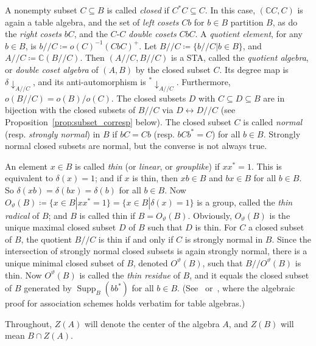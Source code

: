 \documentclass[ALCO,ThmDefs,Unicode,epreuves]{cedram}
\DeclareMathOperator{\Supp}{Supp}
\newcommand{\C}{{\mathbb C}}
\begin{document}
A nonempty subset $C \subseteq B$ is called \emph{closed} if $C^*C
\subseteq C$. In this case, $({\C}C, C)$ is again a table algebra, and
the set of \emph{left cosets} $Cb$ for $b \in B$ partition $B$, as do
the \emph{right cosets} $bC$, and the $C$-$C$ \emph{double cosets}
$CbC$. A \emph{quotient element}, for any $b \in B$, is $b//C \coloneqq 
o(C)^{-1}(CbC)^+$. Let $B//C \coloneqq \{b//C | b \in B\}$, and
$A//C \coloneqq {\C}(B//C)$. Then $(A//C, B//C)$ is a
STA, called the \emph{quotient algebra}, or \emph{double coset algebra}
of $(A, B)$ by the closed subset $C$. Its degree map is
$\delta\downarrow _{A//C}$, and its anti-automorphism is
${^*}\downarrow_{A//C}$. Furthermore, $o(B//C) =
o(B)/o(C)$. The closed subsets $D$ with $C \subseteq D \subseteq B$ are
in bijection with the closed subsets of $B//C$ via $D
\leftrightarrow D//C$ (see Proposition~\ref{prop:subset_corresp} below). The closed subset $C$ is called \emph{normal} (resp.
\emph{strongly normal}) in $B$ if $bC = Cb$ (resp. $bCb^* = C$) for all
$b \in B$. Strongly normal closed subsets are normal, but the converse
is not always true. 

An element $x \in B$ is called \emph{thin} (or \emph{linear}, or
\emph{grouplike}) if $xx^* = 1$. This is equivalent to $\delta(x) = 1$; 
and if $x$ is thin, then $xb \in B$ and $bx \in B$ for all $b \in B$.
So $\delta(xb) = \delta(bx) = \delta(b)$ for all $b \in B$. Now
$O_{\vartheta}(B)\coloneqq \{x \in B | xx^* = 1\} = \{x \in B |
\delta(x) = 1\}$ is a group, called the \emph{thin radical} of $B$; and
$B$ is called thin if $B = O_{\vartheta}(B)$. Obviously,
$O_{\vartheta}(B)$ is the unique maximal closed subset $D$ of $B$
such that $D$ is thin. For $C$ a closed subset of $B$, the quotient
$B//C$ is thin if and only if $C$ is strongly normal in $B$. Since the
intersection of strongly normal closed subsets is again strongly normal,
there is a unique minimal closed subset of $B$, denoted
$O^{\vartheta}(B)$, such that $B//O^{\vartheta}(B)$ is thin. Now
$O^{\vartheta}(B)$ is called the \emph{thin residue} of $B$, and it
equals the closed subset of $B$ generated by $\Supp _B(bb^*)$ for
all $b \in B$. (See~\cite[Theorem~2.3.1]{Z1} or~\cite [Theorem~3.2.1]{Z2}, 
where the algebraic proof for association schemes holds
verbatim for table algebras.) 


Throughout, $Z(A)$ will denote the center of the algebra $A$, and $Z(B)$
will mean $B \cap Z(A)$.
\end{document}

